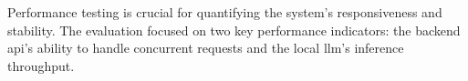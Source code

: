 Performance testing is crucial for quantifying the system's responsiveness and stability. The evaluation focused on two key performance indicators: the backend \acs{api}'s ability to handle concurrent requests and the local \acs{llm}'s inference throughput.